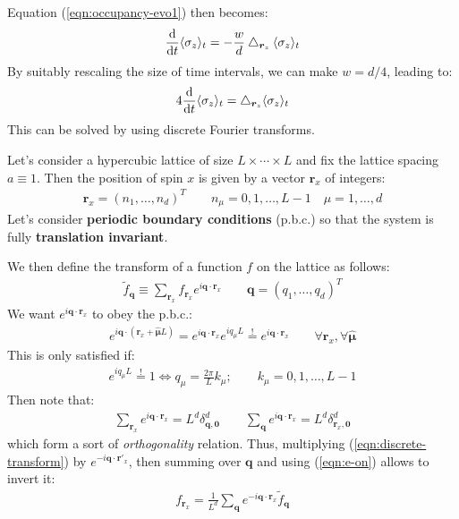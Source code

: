 \documentclass[../../main.tex]{subfiles}
\begin{document}
Equation (\ref{eqn:occupancy-evo1}) then becomes:
\begin{align*}
    \dv{t} \langle \sigma_z \rangle_t = - \frac{w}{d} \bigtriangleup_{\bm{r}_z} \langle \sigma_z \rangle_t
\end{align*}
By suitably rescaling the size of time intervals, we can make $w = d/4$, leading to:
\begin{align}\label{eqn:occupancy-evo2}
    4 \dv{t} \langle \sigma_z \rangle_t = \bigtriangleup_{\bm{r}_z} \langle \sigma_z \rangle_t
\end{align}
This can be solved by using discrete Fourier transforms.

\medskip

Let's consider a hypercubic lattice of size $L \times \cdots \times L$ and fix the lattice spacing $a \equiv 1$. Then the position of spin $x$ is given by a vector $\bm{r}_x$ of integers:
\begin{align*}
    \bm{r}_x = (n_1, \dots, n_d)^T \qquad n_\mu = 0,1,\dots,L-1 \quad \mu=1,\dots,d
\end{align*}
Let's consider \textbf{periodic boundary conditions} (p.b.c.) so that the system is fully \textbf{translation invariant}.

\medskip

We then define the transform of a function $f$ on the lattice as follows:
\begin{align}\label{eqn:dicrete-transform}
    \tilde{f}_{\bm{q}} \equiv \sum_{\bm{r}_x} f_{\bm{r}_x} e^{i \bm{q} \cdot \bm{r}_x} \qquad \bm{q}=(q_1,\dots, q_d)^T
\end{align}
We want $e^{i \bm{q} \cdot \bm{r}_x}$ to obey the p.b.c.: %
\begin{align*}
    e^{i \bm{q} \cdot (\bm{r}_x + \bm{\hat{\mu}}L)} = e^{i \bm{q} \cdot \bm{r}_x} e^{i q_\mu L}\overset{!}{=}  e^{i \bm{q} \cdot \bm{r}_x} \qquad \forall \bm{r}_x, \forall \bm{\hat{\mu}}
\end{align*}
This is only satisfied if:
\begin{align}\label{eqn:periodicity-constraint}
    e^{i q_\mu L} \overset{!}{=}  1 \Leftrightarrow q_\mu = \frac{2 \pi}{L} k_\mu; \qquad k_\mu = 0,1,\dots,L-1 
\end{align}
Then note that: %
\begin{align}\label{eqn:e-on}
    \sum_{\bm{r}_x} e^{i \bm{q} \cdot \bm{r}_x} = L^d \delta^d_{\bm{q},\bm{0}} \qquad \sum_{\bm{q}} e^{i \bm{q} \cdot \bm{r}_x} = L^d \delta^d_{\bm{r}_x, \bm{0}}
\end{align}
which form a sort of \textit{orthogonality} relation. Thus, multiplying (\ref{eqn:discrete-transform}) by $e^{-i \bm{q} \cdot \bm{r'}_x}$, then summing over $\bm{q}$ and using (\ref{eqn:e-on}) allows to invert it:
\begin{align}\label{eqn:inverse-transform}
    f_{\bm{r}_x} = \frac{1}{L^d} \sum_{\bm{q}} e^{-i \bm{q} \cdot \bm{r}_x}  \tilde{f}_{\bm{q}}
\end{align}
\end{document}
